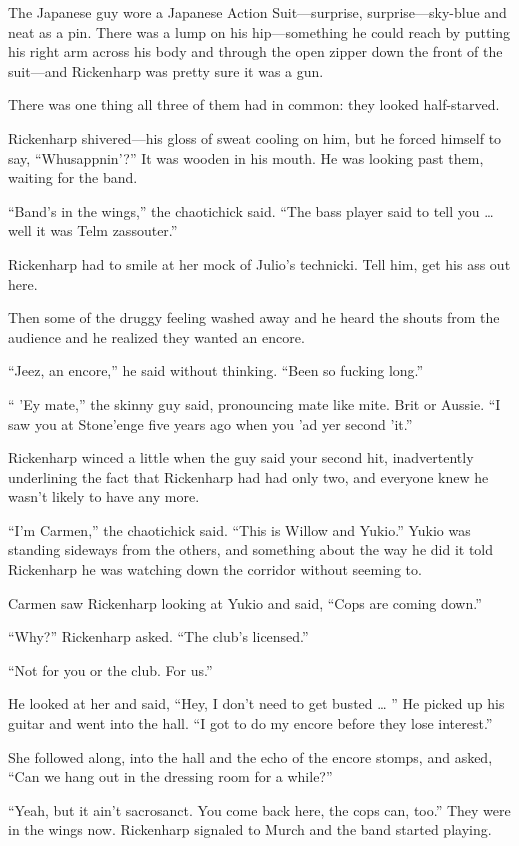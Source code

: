 The Japanese guy wore a Japanese Action Suit—surprise, surprise—sky-blue and neat as a pin. There was a lump on his hip—something he could reach by putting his right arm across his body and through the open zipper down the front of the suit—and Rickenharp was pretty sure it was a gun.

There was one thing all three of them had in common: they looked half-starved.

Rickenharp shivered—his gloss of sweat cooling on him, but he forced himself to say, “Whusappnin’?” It was wooden in his mouth. He was looking past them, waiting for the band.

“Band’s in the wings,” the chaotichick said. “The bass player said to tell you … well it was Telm zassouter.”

Rickenharp had to smile at her mock of Julio’s technicki. Tell him, get his ass out here.

Then some of the druggy feeling washed away and he heard the shouts from the audience and he realized they wanted an encore.

“Jeez, an encore,” he said without thinking. “Been so fucking long.”

“ ’Ey mate,” the skinny guy said, pronouncing mate like mite. Brit or Aussie. “I saw you at Stone’enge five years ago when you ’ad yer second ’it.”

Rickenharp winced a little when the guy said your second hit, inadvertently underlining the fact that Rickenharp had had only two, and everyone knew he wasn’t likely to have any more.

“I’m Carmen,” the chaotichick said. “This is Willow and Yukio.” Yukio was standing sideways from the others, and something about the way he did it told Rickenharp he was watching down the corridor without seeming to.

Carmen saw Rickenharp looking at Yukio and said, “Cops are coming down.”

“Why?” Rickenharp asked. “The club’s licensed.”

“Not for you or the club. For us.”

He looked at her and said, “Hey, I don’t need to get busted … ” He picked up his guitar and went into the hall. “I got to do my encore before they lose interest.”

She followed along, into the hall and the echo of the encore stomps, and asked, “Can we hang out in the dressing room for a while?”

“Yeah, but it ain’t sacrosanct. You come back here, the cops can, too.” They were in the wings now. Rickenharp signaled to Murch and the band started playing.

